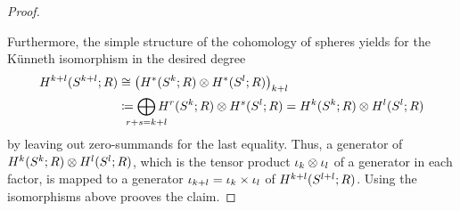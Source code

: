 \begin{Cor}
\begin{proof}
\begin{center}
    \end{center}
    Furthermore, the simple structure of the cohomology of spheres
    yields for the Künneth isomorphism in the desired degree
    \begin{align*}
      H^{\rkk+\rkl}(\Sphere{\rkk+\rkl};R)
      &\cong
        \left(H^*(\Sphere{\rkk}; R)\otimes H^*(\Sphere{\rkl}; R)\right)_{\rkk+\rkl}\\
      &\coloneqq
        \bigoplus_{\mathclap{r+s=\rkk+\rkl}}
        H^r(\Sphere{\rkk};R)\otimes H^s(\Sphere{\rkl};R)
        =
        H^{\rkk}(\Sphere{\rkk};R)\otimes H^{\rkl}(\Sphere{\rkl};R)
    \end{align*}
    by leaving out zero-summands for the last equality.
    Thus, a generator of
    $H^{k}(S^{k}; R)\otimes H^{l}(S^{l}; R)$,
    which is the tensor product $\iota_{k}\otimes\iota_{l}$ of a generator
    in each factor,
    is mapped to a generator $\iota_{k+l}=\iota_{k}\times\iota_{l}$ of
    $H^{k+l}(S^{l+l}; R)$.
    Using the isomorphisms above prooves the claim.
  \end{proof}
\end{Cor}

